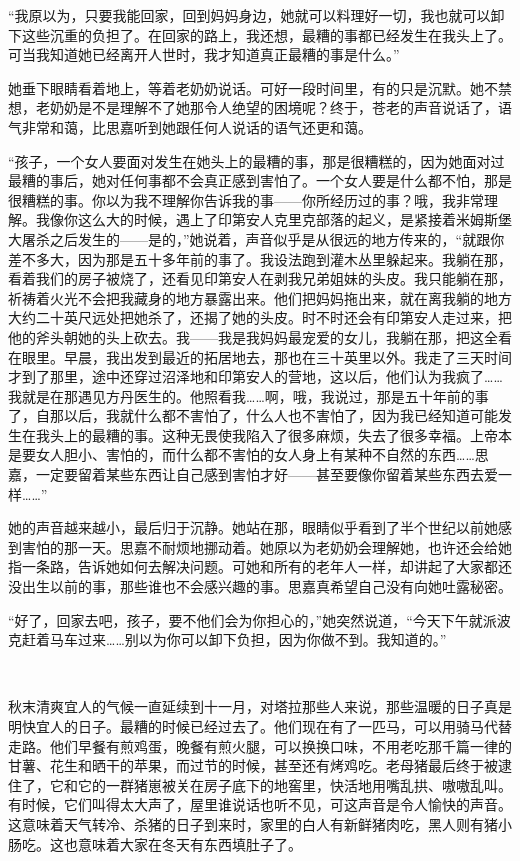 \par “我原以为，只要我能回家，回到妈妈身边，她就可以料理好一切，我也就可以卸下这些沉重的负担了。在回家的路上，我还想，最糟的事都已经发生在我头上了。可当我知道她已经离开人世时，我才知道真正最糟的事是什么。”
\par 她垂下眼睛看着地上，等着老奶奶说话。可好一段时间里，有的只是沉默。她不禁想，老奶奶是不是理解不了她那令人绝望的困境呢？终于，苍老的声音说话了，语气非常和蔼，比思嘉听到她跟任何人说话的语气还更和蔼。
\par “孩子，一个女人要面对发生在她头上的最糟的事，那是很糟糕的，因为她面对过最糟的事后，她对任何事都不会真正感到害怕了。一个女人要是什么都不怕，那是很糟糕的事。你以为我不理解你告诉我的事——你所经历过的事？哦，我非常理解。我像你这么大的时候，遇上了印第安人克里克部落的起义，是紧接着米姆斯堡大屠杀之后发生的——是的，”她说着，声音似乎是从很远的地方传来的，“就跟你差不多大，因为那是五十多年前的事了。我设法跑到灌木丛里躲起来。我躺在那，看着我们的房子被烧了，还看见印第安人在剥我兄弟姐妹的头皮。我只能躺在那，祈祷着火光不会把我藏身的地方暴露出来。他们把妈妈拖出来，就在离我躺的地方大约二十英尺远处把她杀了，还揭了她的头皮。时不时还会有印第安人走过来，把他的斧头朝她的头上砍去。我——我是我妈妈最宠爱的女儿，我躺在那，把这全看在眼里。早晨，我出发到最近的拓居地去，那也在三十英里以外。我走了三天时间才到了那里，途中还穿过沼泽地和印第安人的营地，这以后，他们认为我疯了……我就是在那遇见方丹医生的。他照看我……啊，哦，我说过，那是五十年前的事了，自那以后，我就什么都不害怕了，什么人也不害怕了，因为我已经知道可能发生在我头上的最糟的事。这种无畏使我陷入了很多麻烦，失去了很多幸福。上帝本是要女人胆小、害怕的，而什么都不害怕的女人身上有某种不自然的东西……思嘉，一定要留着某些东西让自己感到害怕才好——甚至要像你留着某些东西去爱一样……”
\par 她的声音越来越小，最后归于沉静。她站在那，眼睛似乎看到了半个世纪以前她感到害怕的那一天。思嘉不耐烦地挪动着。她原以为老奶奶会理解她，也许还会给她指一条路，告诉她如何去解决问题。可她和所有的老年人一样，却讲起了大家都还没出生以前的事，那些谁也不会感兴趣的事。思嘉真希望自己没有向她吐露秘密。
\par “好了，回家去吧，孩子，要不他们会为你担心的，”她突然说道，“今天下午就派波克赶着马车过来……别以为你可以卸下负担，因为你做不到。我知道的。”
\par  
\par 秋末清爽宜人的气候一直延续到十一月，对塔拉那些人来说，那些温暖的日子真是明快宜人的日子。最糟的时候已经过去了。他们现在有了一匹马，可以用骑马代替走路。他们早餐有煎鸡蛋，晚餐有煎火腿，可以换换口味，不用老吃那千篇一律的甘薯、花生和晒干的苹果，而过节的时候，甚至还有烤鸡吃。老母猪最后终于被逮住了，它和它的一群猪崽被关在房子底下的地窖里，快活地用嘴乱拱、嗷嗷乱叫。有时候，它们叫得太大声了，屋里谁说话也听不见，可这声音是令人愉快的声音。这意味着天气转冷、杀猪的日子到来时，家里的白人有新鲜猪肉吃，黑人则有猪小肠吃。这也意味着大家在冬天有东西填肚子了。
